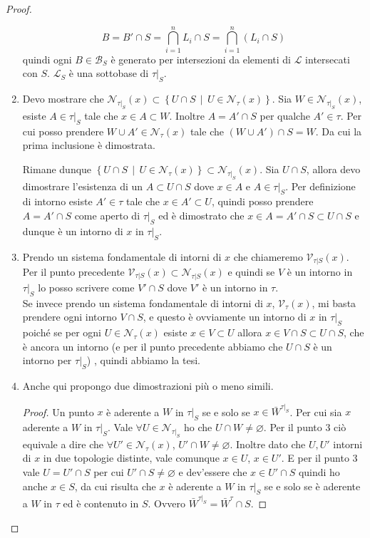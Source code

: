 \begin{proof}
\begin{enumerate}
		\begin{equation*}
			B = B' \cap S = \bigcap^n_{i=1} L_i \cap S = \bigcap^n_{i=1} (L_i \cap S)
		\end{equation*} 
		quindi ogni $B \in \mathcal{B}_S$ è generato per intersezioni da elementi di $\mathcal{L}$ intersecati con $S$. $\mathcal{L}_S$ è una sottobase di $\tau|_S$. 
	\item 
		Devo mostrare che $\mathcal{N}_{\tau|_S}(x) \subset \left\{ U \cap S \,\middle|\, U \in \mathcal{N}_\tau(x) \right\}$. Sia $W \in \mathcal{N}_{\tau|_S}(x)$, esiste $A \in \tau|_S$ tale che $x \in A \subset W$. Inoltre $A = A' \cap S$ per qualche $A' \in \tau$. Per cui posso prendere $W \cup A' \in \mathcal{N}_\tau(x)$ tale che $(W \cup A') \cap S = W$. Da cui la prima inclusione è dimostrata.
		
		Rimane dunque $\left\{ U \cap S \,\middle|\, U \in \mathcal{N}_\tau(x) \right\} \subset \mathcal{N}_{\tau|_S}(x)$. Sia $U \cap S$, allora devo dimostrare l'esistenza di un $A \subset U \cap S$ dove $x \in A$ e $A \in \tau|_S$. Per definizione di intorno esiste $A' \in \tau$ tale che $x \in A' \subset U$, quindi posso prendere $A = A' \cap S$ come aperto di $\tau|_S$ ed è dimostrato che $x \in A = A' \cap S \subset U \cap S$ e dunque è un intorno di $x$ in $\tau|_S$.
	\item 
		Prendo un sistema fondamentale di intorni di $x$ che chiameremo $\mathcal{V}_{\tau|S}(x)$. Per il punto precedente $\mathcal{V}_{\tau|S}(x) \subset \mathcal{N}_{\tau|S}(x)$ e quindi se $V$ è un intorno in $\tau|_S$ lo posso scrivere come $V' \cap S$ dove $V'$ è un intorno in $\tau$.\\
		Se invece prendo un sistema fondamentale di intorni di $x$, $\mathcal{V}_{\tau}(x)$, mi basta prendere ogni intorno $V \cap S$, e questo è ovviamente un intorno di $x$ in $\tau|_S$ poiché se per ogni $U \in \mathcal{N}_\tau(x)$ esiste $x \in V \subset U$ allora $x \in V\cap S \subset U \cap S$, che è ancora un intorno (e per il punto precedente abbiamo che $U \cap S$ è un intorno per $\tau|_S$) , quindi abbiamo la tesi. 
	\item Anche qui propongo due dimostrazioni più o meno simili.
	\begin{proof}
		Un punto $x$ è aderente a $W$ in $\tau|_S$ se e solo se $x \in \bar{W}^{\tau|_S}$. Per cui sia $x$ aderente a $W$ in $\tau|_S$. Vale $\forall U \in \mathcal{N}_{\tau|_S}$ ho che $U \cap W \neq \varnothing$. Per il punto 3 ciò equivale a dire che $\forall U' \in \mathcal{N}_\tau(x)$, $U' \cap W \neq \varnothing$. Inoltre dato che $U, U'$ intorni di $x$ in due topologie distinte, vale comunque $x \in U$, $x \in U'$. E per il punto 3 vale $U = U' \cap S$ per cui $U' \cap S \neq \varnothing$ e dev'essere che $x \in U' \cap S$ quindi ho anche $x \in S$, da cui risulta che $x$ è aderente a $W$ in $\tau|_S$  se e solo se è aderente a $W$ in $\tau$ ed è contenuto in $S$. Ovvero $\bar{W}^{\tau|_S} = \bar{W}^{\tau} \cap S$. 

\end{proof}
\end{enumerate}
\end{proof}
